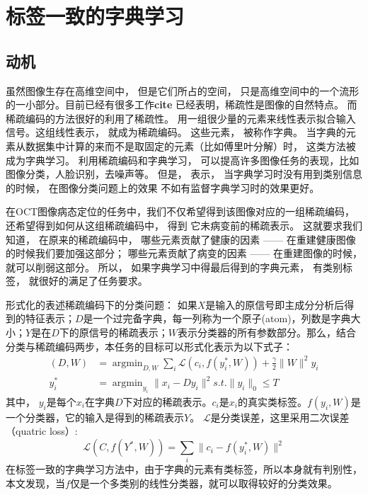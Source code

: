 \section{标签一致的字典学习}
\label{sec:lc-ksvd}
    \subsection{动机}
    虽然图像生存在高维空间中， 但是它们所占的空间， 只是高维空间中的一个流形的一小部分。目前已经有很多工作\textbf{cite} 已经表明，稀疏性是图像的自然特点。 而稀疏编码的方法很好的利用了稀疏性。 用一组很少量的元素来线性表示拟合输入信号。这组线性表示， 就成为稀疏编码。 这些元素， 被称作字典。 当字典的元素从数据集中计算的来而不是取固定的元素（比如傅里叶分解）时， 这类方法被成为字典学习。  利用稀疏编码和字典学习， 可以提高许多图像任务的表现，比如图像分类\cite{lazebnik2006beyond,gao2010kernel}，人脸识别\cite{zhang2010discriminative,wright2009robust}，去噪声\cite{elad2006image, dong2013nonlocally, dong2014learning}等。  但是， 表示， 当字典学习时没有用到类别信息的时候，  在图像分类问题上的效果 不如有监督字典学习时的效果更好。 

    在OCT图像病态定位的任务中，我们不仅希望得到该图像对应的一组稀疏编码， 还希望得到如何从这组稀疏编码中， 得到 它未病变前的稀疏表示。 这就要求我们 知道， 在原来的稀疏编码中， 哪些元素贡献了健康的因素 —— 在重建健康图像的时候我们要加强这部分； 哪些元素贡献了病变的因素 —— 在重建图像的时候， 就可以削弱这部分。  所以， 如果字典学习中得最后得到的字典元素， 有类别标签\cite{jiang2013label}， 就很好的满足了任务要求。

    形式化的表述稀疏编码下的分类问题：    
    如果$X$是输入的原信号即主成分分析后得到的特征表示；$D$是一个过完备字典，每一列称为一个原子(atom)，列数是字典大小；$Y$是在$D$下的原信号的稀疏表示；$W$表示分类器的所有参数部分。那么，结合分类与稀疏编码两步，本任务的目标可以形式化表示为以下式子：
    \begin{align}
        (D, W) & = \mathop{\arg \min}_{D, W} \sum_i \mathcal{L} (c_i, f(y_i^*, W)) + \frac{\gamma}{2}\|W\| ^2
        y_i \\
        y_i^* & = \mathop{\arg \min}_{y_i} \|x_i - Dy_i\| ^2 s.t. \|y_i\|_0 \le T \label{alg:line:ksvd-over2}
    \end{align}
    其中， $y_i$是每个$x_i$在字典$D$下对应的稀疏表示。$c_i$是$x_i$的真实类标签。$f(y_i, W)$是一个分类器，它的输入是得到的稀疏表示$Y$。 $\mathcal{L}$是分类误差，这里采用二次误差（quatric loss）:
    \begin{equation}
        \mathcal{L}(C, f(Y^*, W)) = \sum _i \|c_i - f(y_i^* , W) \| ^2 
    \end{equation}
    在标签一致的字典学习方法中，由于字典的元素有类标签，所以本身就有判别性，本文发现，当$f$仅是一个多类别的线性分类器，就可以取得较好的分类效果。


